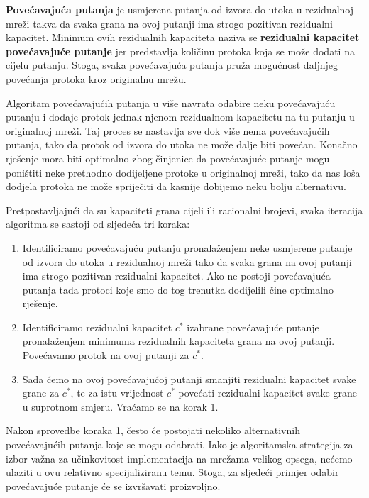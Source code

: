 \documentclass[11pt, a4paper]{article}
\begin{document}
	\textbf{Povećavajuća putanja} je usmjerena putanja od izvora do utoka u rezidualnoj mreži takva da svaka grana na ovoj putanji ima strogo pozitivan rezidualni kapacitet. Minimum ovih rezidualnih kapaciteta naziva se \textbf{rezidualni kapacitet povećavajuće putanje} jer predstavlja količinu protoka koja se može dodati na cijelu putanju. Stoga, svaka povećavajuća putanja pruža mogućnost daljnjeg povećanja protoka kroz originalnu mrežu.
	
	Algoritam povećavajućih putanja u više navrata odabire neku povećavajuću putanju i dodaje protok jednak njenom rezidualnom kapacitetu na tu putanju u originalnoj mreži. Taj proces se nastavlja sve dok više nema povećavajućih putanja, tako da protok od izvora do utoka ne može dalje biti povećan. Konačno rješenje mora biti optimalno zbog činjenice da povećavajuće putanje mogu poništiti neke prethodno dodijeljene protoke u originalnoj mreži, tako da nas loša dodjela protoka ne može spriječiti da kasnije dobijemo neku bolju alternativu.
	
	Pretpostavljajući da su kapaciteti grana cijeli ili racionalni brojevi, svaka iteracija algoritma se sastoji od sljedeća tri koraka:
	
	\begin{enumerate}
		\item Identificiramo povećavajuću putanju pronalaženjem neke usmjerene putanje od izvora do utoka u rezidualnoj mreži tako da svaka grana na ovoj putanji ima strogo pozitivan rezidualni kapacitet. Ako ne postoji povećavajuća putanja tada protoci koje smo do tog trenutka dodijelili čine optimalno rješenje.
		\item Identificiramo rezidualni kapacitet $c^*$ izabrane povećavajuće putanje pronalaženjem minimuma rezidualnih kapaciteta grana na ovoj putanji. Povećavamo protok na ovoj putanji za $c^*$.
		\item Sada ćemo na ovoj povećavajućoj putanji smanjiti rezidualni kapacitet svake grane za $c^*$, te za istu vrijednost $c^*$ povećati rezidualni kapacitet svake grane u suprotnom smjeru. Vraćamo se na korak 1.
	\end{enumerate}
	
	Nakon sprovedbe koraka 1, često će postojati nekoliko alternativnih povećavajućih putanja koje se mogu odabrati. Iako je algoritamska strategija za izbor važna za učinkovitost implementacija na mrežama velikog opsega, nećemo ulaziti u ovu relativno specijaliziranu temu. Stoga, za sljedeći primjer odabir povećavajuće putanje će se izvršavati proizvoljno.
	
\end{document}
